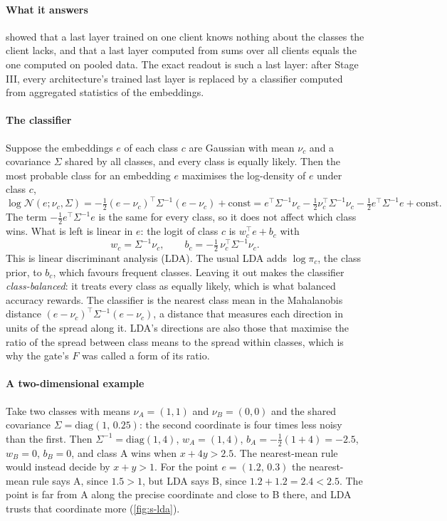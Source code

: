 \paragraph{What it answers}  showed that a last layer trained on one client knows nothing about
the classes the client lacks, and that a last layer computed from sums over all clients equals the one computed on
pooled data. The exact readout is such a last layer: after Stage III, every architecture's trained last layer is
replaced by a classifier computed from aggregated statistics of the embeddings.

\paragraph{The classifier} Suppose the embeddings $e$ of each class $c$ are Gaussian with mean $\nu_c$ and a covariance
$\Sigma$ shared by all classes, and every class is equally likely. Then the most probable class for an embedding $e$
maximises the log-density of $e$ under class $c$,
\[
\log \mathcal N(e;\nu_c,\Sigma)=-\tfrac12(e-\nu_c)^\top\Sigma^{-1}(e-\nu_c)+\text{const}
= e^\top\Sigma^{-1}\nu_c-\tfrac12\nu_c^\top\Sigma^{-1}\nu_c-\tfrac12e^\top\Sigma^{-1}e+\text{const}.
\]
The term $-\frac12e^\top\Sigma^{-1}e$ is the same for every class, so it does not affect which class wins. What is left
is linear in $e$: the logit of class $c$ is $w_c^\top e+b_c$ with
\[
w_c=\Sigma^{-1}\nu_c,\qquad b_c=-\tfrac12\,\nu_c^\top\Sigma^{-1}\nu_c .
\]
This is linear discriminant analysis (LDA). The usual LDA adds $\log\pi_c$, the class prior, to $b_c$, which favours
frequent classes. Leaving it out makes the classifier \emph{class-balanced}: it treats every class as equally likely,
which is what balanced accuracy rewards. The classifier is the nearest class mean in the Mahalanobis distance
$(e-\nu_c)^\top\Sigma^{-1}(e-\nu_c)$, a distance that measures each direction in units of the spread along it. LDA's
directions are also those that maximise the ratio of the spread between class means to the spread within classes,
which is why the gate's $F$ was called a form of its ratio.

\paragraph{A two-dimensional example} Take two classes with means $\nu_A=(1,1)$ and $\nu_B=(0,0)$ and the shared
covariance $\Sigma=\mathrm{diag}(1,\,0.25)$: the second coordinate is four times less noisy than the first. Then
$\Sigma^{-1}=\mathrm{diag}(1,4)$, $w_A=(1,4)$, $b_A=-\frac12(1+4)=-2.5$, $w_B=0$, $b_B=0$, and class A wins when
$x+4y>2.5$. The nearest-mean rule would instead decide by $x+y>1$. For the point $e=(1.2,\,0.3)$ the nearest-mean rule
says A, since $1.5>1$, but LDA says B, since $1.2+1.2=2.4<2.5$. The point is far from A along the precise coordinate
and close to B there, and LDA trusts that coordinate more (\cref{fig:s-lda}).

